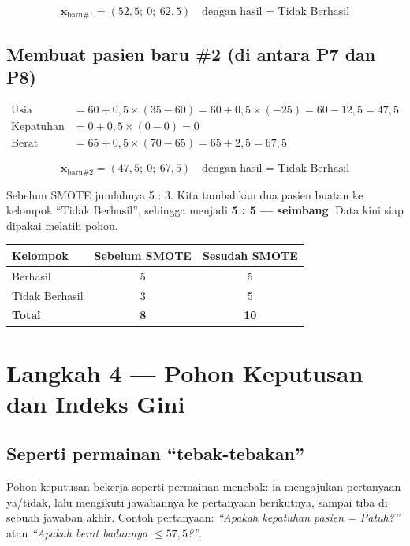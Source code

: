 \documentclass[11pt,a4paper]{article}
\begin{document}
\[ \mathbf{x}_{\text{baru}\#1} = (52{,}5;\ 0;\ 62{,}5) \quad\text{dengan hasil = Tidak Berhasil} \]

\subsection{Membuat pasien baru \#2 (di antara P7 dan P8)}

\begin{align*}
\text{Usia}      &= 60 + 0{,}5 \times (35 - 60) = 60 + 0{,}5 \times (-25) = 60 - 12{,}5 = 47{,}5 \\
\text{Kepatuhan} &= 0  + 0{,}5 \times (0 - 0)   = 0 \\
\text{Berat}     &= 65 + 0{,}5 \times (70 - 65) = 65 + 2{,}5 = 67{,}5
\end{align*}

\[ \mathbf{x}_{\text{baru}\#2} = (47{,}5;\ 0;\ 67{,}5) \quad\text{dengan hasil = Tidak Berhasil} \]

\begin{hasil}
Sebelum SMOTE jumlahnya 5 : 3. Kita tambahkan dua pasien buatan ke kelompok ``Tidak Berhasil'',
sehingga menjadi \textbf{5 : 5 --- seimbang}. Data kini siap dipakai melatih pohon.
\end{hasil}

\begin{center}
\begin{tabular}{lcc}
\toprule
\textbf{Kelompok} & \textbf{Sebelum SMOTE} & \textbf{Sesudah SMOTE} \\
\midrule
Berhasil        & 5 & 5 \\
Tidak Berhasil  & 3 & 5 \\
\midrule
\textbf{Total}  & \textbf{8} & \textbf{10} \\
\bottomrule
\end{tabular}
\end{center}

\section{Langkah 4 --- Pohon Keputusan dan Indeks Gini}

\subsection{Seperti permainan ``tebak-tebakan''}

Pohon keputusan bekerja seperti permainan menebak: ia mengajukan pertanyaan ya/tidak, lalu
mengikuti jawabannya ke pertanyaan berikutnya, sampai tiba di sebuah jawaban akhir. Contoh
pertanyaan: \emph{``Apakah kepatuhan pasien = Patuh?''} atau \emph{``Apakah berat badannya
$\le 57{,}5$?''}.
\end{document}
